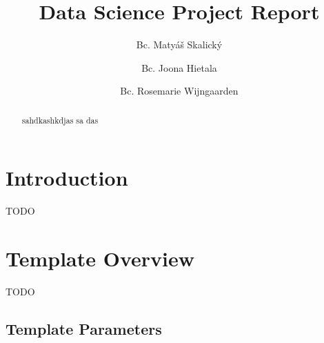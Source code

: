 \documentclass[sigconf]{acmart}
\begin{document}
\title{Data Science Project Report}

\author{Bc. Matyáš Skalický}

\author{Bc. Joona Hietala}

\author{Bc. Rosemarie Wijngaarden}

\begin{abstract}
	sahdkashkdjas sa das 
\end{abstract}

\maketitle

\section{Introduction}
TODO

\section{Template Overview}
TODO

\subsection{Template Parameters}





\appendix
\end{document}
